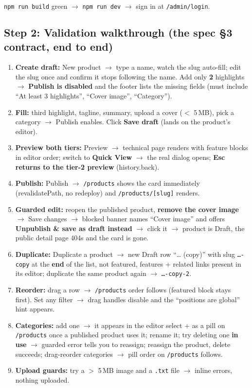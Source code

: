 \documentclass[11pt,a4paper]{article}
\begin{document}
\texttt{npm run build} green $\rightarrow$ \texttt{npm run dev} $\rightarrow$ sign in at
\texttt{/admin/login}.

\subsection*{Step 2: Validation walkthrough (the spec \S3 contract, end to end)}

\begin{enumerate}
  \item \textbf{Create draft:} New product $\rightarrow$ type a name, watch the slug auto-fill; edit the
        slug once and confirm it stops following the name. Add only \textbf{2} highlights $\rightarrow$
        \textbf{Publish is disabled} and the footer lists the missing fields (must include ``At least 3
        highlights'', ``Cover image'', ``Category'').
  \item \textbf{Fill:} third highlight, tagline, summary, upload a cover ($<$ 5\,MB), pick a category
        $\rightarrow$ Publish enables. Click \textbf{Save draft} (lands on the product's editor).
  \item \textbf{Preview both tiers:} Preview $\rightarrow$ technical page renders with feature blocks in
        editor order; switch to \textbf{Quick View} $\rightarrow$ the real dialog opens; \textbf{Esc
        returns to the tier-2 preview} (history.back).
  \item \textbf{Publish:} Publish $\rightarrow$ \texttt{/products} shows the card immediately
        (revalidatePath, no redeploy) and \texttt{/products/[slug]} renders.
  \item \textbf{Guarded edit:} reopen the published product, \textbf{remove the cover image}
        $\rightarrow$ Save changes $\rightarrow$ blocked banner names ``Cover image'' and offers
        \textbf{Unpublish \& save as draft instead} $\rightarrow$ click it $\rightarrow$ product is
        Draft, the public detail page 404s and the card is gone.
  \item \textbf{Duplicate:} Duplicate a product $\rightarrow$ new Draft row ``\ldots{} (copy)'' with slug
        \texttt{\ldots{}-copy} at the \textbf{end} of the list, not featured, features + related links
        present in its editor; duplicate the same product again $\rightarrow$ \texttt{\ldots{}-copy-2}.
  \item \textbf{Reorder:} drag a row $\rightarrow$ \texttt{/products} order follows (featured block stays
        first). Set any filter $\rightarrow$ drag handles disable and the ``positions are global'' hint
        appears.
  \item \textbf{Categories:} add one $\rightarrow$ it appears in the editor select + as a pill on
        \texttt{/products} once a published product uses it; rename it; try deleting one \textbf{in use}
        $\rightarrow$ guarded error tells you to reassign; reassign the product, delete succeeds;
        drag-reorder categories $\rightarrow$ pill order on \texttt{/products} follows.
  \item \textbf{Upload guards:} try a $>$ 5\,MB image and a \texttt{.txt} file $\rightarrow$ inline
        errors, nothing uploaded.
\end{enumerate}
\end{document}
